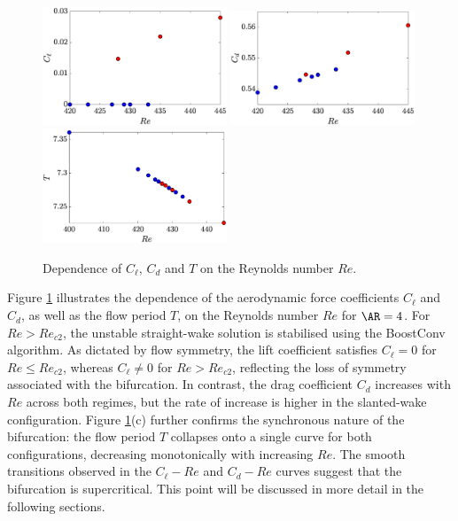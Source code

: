 \begin{figure}
  \centering
  \includegraphics[width=0.49\textwidth]{./fig/AR4_Cl_Re.eps}
  \includegraphics[width=0.49\textwidth]{./fig/AR4_Cd_Re.eps}
  \includegraphics[width=0.49\textwidth]{./fig/AR4_T_Re.eps}
  \caption{Dependence of $C_\ell$, $C_d$ and $T$ on the Reynolds number $Re$.}
  \label{fig:Cl-Cd-AR4}
\end{figure}
%
Figure \ref{fig:Cl-Cd-AR4} illustrates the dependence of the aerodynamic force coefficients $C_\ell$ and $C_d$, as well as the flow period $T$, on the Reynolds number $Re$ for $\AR=4$. For $Re>Re_{c2}$, the unstable straight-wake solution is stabilised using the BoostConv algorithm. As dictated by flow symmetry, the lift coefficient satisfies $C_\ell=0$ for $Re \le Re_{c2}$, whereas $C_\ell \neq 0$ for $Re> Re_{c2}$, reflecting the loss of symmetry associated with the bifurcation. In contrast, the drag coefficient $C_d$ increases with $Re$ across both regimes, but the rate of increase is higher in the slanted-wake configuration.
%
Figure \ref{fig:Cl-Cd-AR4}(c) further confirms the synchronous nature of the bifurcation: the flow period $T$ collapses onto a single curve for both configurations, decreasing monotonically with increasing $Re$. The smooth transitions observed in the $C_\ell-Re$ and $C_d-Re$ curves suggest that the bifurcation is supercritical. This point will be discussed in more detail in the following sections.

